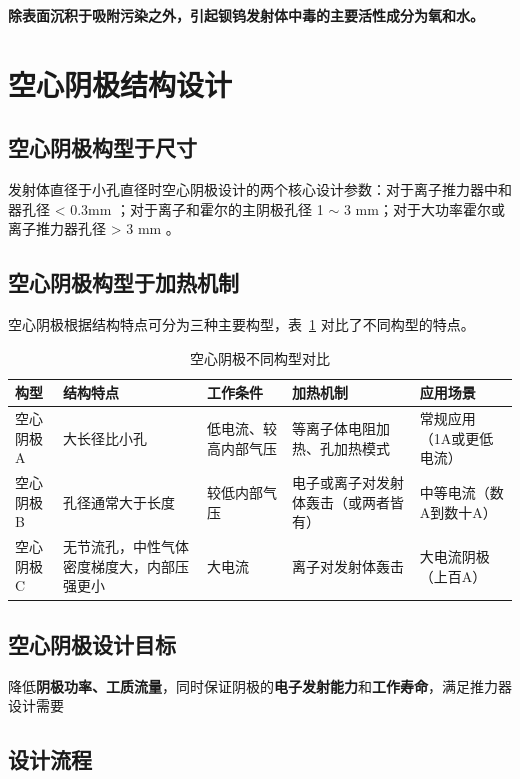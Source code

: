   \textbf{除表面沉积于吸附污染之外，引起钡钨发射体中毒的主要活性成分为氧和水。}

\section{空心阴极结构设计}

  \subsection{空心阴极构型于尺寸}
    发射体直径于小孔直径时空心阴极设计的两个核心设计参数：对于离子推力器中和器孔径 < 0.3mm ；对于离子和霍尔的主阴极孔径 1 $\sim$ 3 mm；对于大功率霍尔或离子推力器孔径 > 3 mm 。

  \subsection{空心阴极构型于加热机制}

    空心阴极根据结构特点可分为三种主要构型，表~\ref{tab:cathode_configurations} 对比了不同构型的特点。

    \begin{table}[htbp]
      \centering
      \caption{空心阴极不同构型对比}
      \label{tab:cathode_configurations}
      \renewcommand{\arraystretch}{1.5}
      \begin{tabular}{p{2.2cm}p{3.5cm}p{2.5cm}p{3.5cm}p{2.6cm}}
        \toprule
        构型 & 结构特点 & 工作条件 & 加热机制 & 应用场景 \\
        \midrule
        空心阴极A & 大长径比小孔 & 低电流、较高内部气压 & 等离子体电阻加热、孔加热模式 & 常规应用（1A或更低电流） \\
        空心阴极B & 孔径通常大于长度 & 较低内部气压 & 电子或离子对发射体轰击（或两者皆有） & 中等电流（数A到数十A） \\
        空心阴极C & 无节流孔，中性气体密度梯度大，内部压强更小 & 大电流 & 离子对发射体轰击 & 大电流阴极（上百A） \\
        \bottomrule
      \end{tabular}
    \end{table}
  
  \subsection{空心阴极设计目标}
    降低\textbf{阴极功率、工质流量}，同时保证阴极的\textbf{电子发射能力}和\textbf{工作寿命}，满足推力器设计需要


  \subsection{设计流程}

